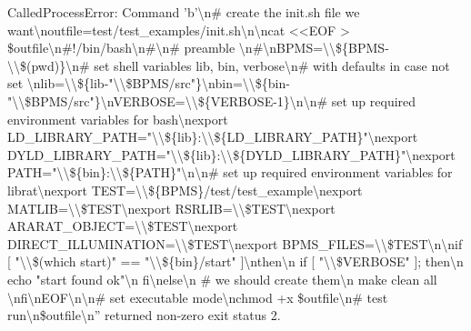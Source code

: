 \documentclass[letterpaper,10pt,english]{sphinxmanual}
\begin{document}
{\begin{sphinxVerbatim}[commandchars=\\\{\}]
\textcolor{ansi-red}{CalledProcessError}: Command 'b'\textbackslash{}n\# create the init.sh file we want\textbackslash{}noutfile=test/test\_examples/init.sh\textbackslash{}n\textbackslash{}ncat <<EOF > \$outfile\textbackslash{}n\#!/bin/bash\textbackslash{}n\#\textbackslash{}n\# preamble \textbackslash{}n\#\textbackslash{}nBPMS=\textbackslash{}\textbackslash{}\$\{BPMS-\textbackslash{}\textbackslash{}\$(pwd)\}\textbackslash{}n\# set shell variables lib, bin, verbose\textbackslash{}n\# with defaults in case not set \textbackslash{}nlib=\textbackslash{}\textbackslash{}\$\{lib-"\textbackslash{}\textbackslash{}\$BPMS/src"\}\textbackslash{}nbin=\textbackslash{}\textbackslash{}\$\{bin-"\textbackslash{}\textbackslash{}\$BPMS/src"\}\textbackslash{}nVERBOSE=\textbackslash{}\textbackslash{}\$\{VERBOSE-1\}\textbackslash{}n\textbackslash{}n\# set up required environment variables for bash\textbackslash{}nexport LD\_LIBRARY\_PATH="\textbackslash{}\textbackslash{}\$\{lib\}:\textbackslash{}\textbackslash{}\$\{LD\_LIBRARY\_PATH\}"\textbackslash{}nexport DYLD\_LIBRARY\_PATH="\textbackslash{}\textbackslash{}\$\{lib\}:\textbackslash{}\textbackslash{}\$\{DYLD\_LIBRARY\_PATH\}"\textbackslash{}nexport PATH="\textbackslash{}\textbackslash{}\$\{bin\}:\textbackslash{}\textbackslash{}\$\{PATH\}"\textbackslash{}n\textbackslash{}n\# set up required environment variables for librat\textbackslash{}nexport TEST=\textbackslash{}\textbackslash{}\$\{BPMS\}/test/test\_example\textbackslash{}nexport MATLIB=\textbackslash{}\textbackslash{}\$TEST\textbackslash{}nexport RSRLIB=\textbackslash{}\textbackslash{}\$TEST\textbackslash{}nexport ARARAT\_OBJECT=\textbackslash{}\textbackslash{}\$TEST\textbackslash{}nexport DIRECT\_ILLUMINATION=\textbackslash{}\textbackslash{}\$TEST\textbackslash{}nexport BPMS\_FILES=\textbackslash{}\textbackslash{}\$TEST\textbackslash{}n\textbackslash{}nif [ "\textbackslash{}\textbackslash{}\$(which start)" == "\textbackslash{}\textbackslash{}\$\{bin\}/start" ]\textbackslash{}nthen\textbackslash{}n  if [ "\textbackslash{}\textbackslash{}\$VERBOSE" ]; then\textbackslash{}n      echo "start found ok"\textbackslash{}n  fi\textbackslash{}nelse\textbackslash{}n  \# we should create them\textbackslash{}n  make clean all \textbackslash{}nfi\textbackslash{}nEOF\textbackslash{}n\textbackslash{}n\# set executable mode\textbackslash{}nchmod +x \$outfile\textbackslash{}n\# test run\textbackslash{}n\$outfile\textbackslash{}n'' returned non-zero exit status 2.
\end{sphinxVerbatim}
}

{
\begin{sphinxVerbatim}[commandchars=\\\{\}]
\llap{\color{nbsphinxin}[ ]:\,\hspace{\fboxrule}\hspace{\fboxsep}}
\end{sphinxVerbatim}
}
\end{document}
